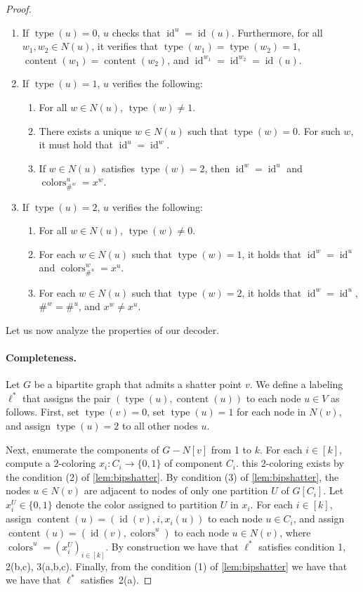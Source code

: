 \documentclass[11pt]{article}
\DeclareMathOperator{\colors}{colors}
\DeclareMathOperator{\content}{content}
\DeclareMathOperator{\id}{id}
\DeclareMathOperator{\type}{type}
\begin{document}
\begin{proof}
\begin{enumerate}
\item If \( \type(u) = 0 \), \( u \) checks that \( \id^u = \id(u) \). Furthermore, for all \( w_1, w_2 \in N(u) \), it verifies that \( \type(w_1) = \type(w_2) = 1 \), \( \content(w_1) = \content(w_2) \), and \( \id^{w_1} = \id^{w_2} = \id(u) \).
\item If \( \type(u) = 1 \), \( u \) verifies the following:
\begin{enumerate}
\item For all \( w \in N(u) \), \( \type(w) \neq 1 \).
\item There exists a unique \( w \in N(u) \) such that \( \type(w) = 0 \). For such \( w \), it must hold that \( \id^u = \id^w \).
\item If \( w \in N(u) \) satisfies \( \type(w) = 2 \), then \( \id^w = \id^u \) and \( \colors^u_{\#^w} = x^w \).
\end{enumerate}
\item If \( \type(u) = 2 \), \( u \) verifies the following:
\begin{enumerate}
\item For all \( w \in N(u) \), \( \type(w) \neq 0 \).
\item For each \( w \in N(u) \) such that \( \type(w) = 1 \), it holds that \( \id^w = \id^u \) and \( \colors^w_{\#^u} = x^u \).
\item For each \( w \in N(u) \) such that \( \type(w) = 2 \), it holds that \( \id^w = \id^u \), \( \#^w = \#^u \), and \( x^w \neq x^u \).
\end{enumerate}
\end{enumerate}

Let us now analyze the properties of our decoder.

\paragraph{Completeness.} Let \( G \) be a bipartite graph that admits a shatter point \( v \). We define a labeling $\ell^*$ that assigns the pair \( (\type(u), \content(u)) \) to each node \( u \in V \) as follows. First, set \( \type(v) = 0 \), set \( \type(u) = 1 \) for each node in \( N(v) \), and assign \( \type(u) = 2 \) to all other nodes \( u \).

Next, enumerate the components of \( G - N[v] \) from 1 to \( k \). For each \( i \in [k] \), compute a 2-coloring \( x_i: C_i \to \{0,1\} \) of component \( C_i \). this 2-coloring exists by the condition (2) of \cref{lem:bipshatter}. By condition (3) of \cref{lem:bipshatter}, the nodes \( u \in N(v) \) are adjacent to nodes of only one partition \( U \) of \( G[C_i] \). Let \( x_i^U \in \{0,1\} \) denote the color assigned to partition \( U \) in \( x_i \). For each \( i \in [k] \), assign \( \content(u) = (\id(v), i, x_i(u)) \) to each node \( u \in C_i \), and assign \( \content(u) = (\id(v), \colors^u )\) to each node \( u \in N(v) \), where $\colors^u = (x_i^U)_{i \in [k]}$. By construction we have that $\ell^*$ satisfies condition 1, 2(b,c), 3(a,b,c). Finally, from the condition (1) of \cref{lem:bipshatter}  we have that we have that $\ell^*$ satisfies~2(a).



\end{proof}
\end{document}
